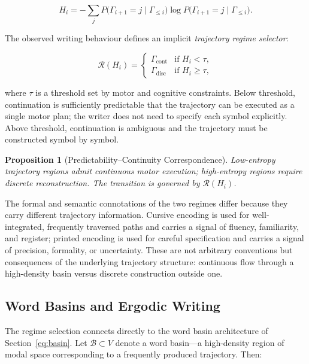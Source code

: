 \documentclass[12pt, a4paper]{article}
\newtheorem{proposition}{Proposition}
\begin{document}
\begin{equation}
H_i = -\sum_j P\!\bigl(\Gamma_{i+1} = j \mid \Gamma_{\leq i}\bigr)\log P\!\bigl(\Gamma_{i+1} = j \mid \Gamma_{\leq i}\bigr).
\label{eq:Hi}
\end{equation}

The observed writing behaviour defines an implicit \emph{trajectory regime selector}:

\begin{equation}
\mathcal{R}(H_i) =
\begin{cases}
\Gamma_{\mathrm{cont}} & \text{if } H_i < \tau, \\
\Gamma_{\mathrm{disc}} & \text{if } H_i \geq \tau,
\end{cases}
\label{eq:regime}
\end{equation}

where $\tau$ is a threshold set by motor and cognitive constraints. Below threshold, continuation is sufficiently predictable that the trajectory can be executed as a single motor plan; the writer does not need to specify each symbol explicitly. Above threshold, continuation is ambiguous and the trajectory must be constructed symbol by symbol.

\begin{proposition}[Predictability--Continuity Correspondence]
Low-entropy trajectory regions admit continuous motor execution; high-entropy regions require discrete reconstruction. The transition is governed by $\mathcal{R}(H_i)$.
\end{proposition}

The formal and semantic connotations of the two regimes differ because they carry different trajectory information. Cursive encoding is used for well-integrated, frequently traversed paths and carries a signal of fluency, familiarity, and register; printed encoding is used for careful specification and carries a signal of precision, formality, or uncertainty. These are not arbitrary conventions but consequences of the underlying trajectory structure: continuous flow through a high-density basin versus discrete construction outside one.

\subsection{Word Basins and Ergodic Writing}

The regime selection connects directly to the word basin architecture of Section~\ref{eq:basin}. Let $\mathcal{B} \subset V$ denote a word basin---a high-density region of modal space corresponding to a frequently produced trajectory. Then:
\end{document}
